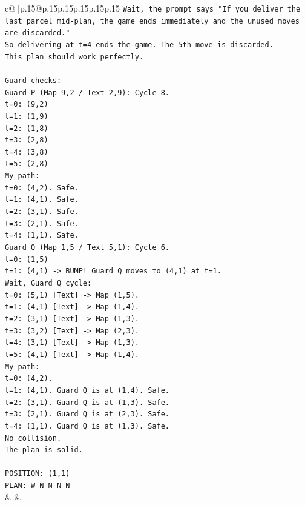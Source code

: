 \documentclass{article}
\begin{document}
{\begin{supertabular}{c@{$\;$}|p{.15\linewidth}@{}p{.15\linewidth}p{.15\linewidth}p{.15\linewidth}p{.15\linewidth}p{.15\linewidth}}
{{{\texttt{Wait, the prompt says "If you deliver the last parcel mid{-}plan, the game ends immediately and the unused moves are discarded."} \\
\texttt{So delivering at t=4 ends the game. The 5th move is discarded.} \\
\texttt{This plan should work perfectly.} \\
\\ 
\texttt{Guard checks:} \\
\texttt{Guard P (Map 9,2 / Text 2,9): Cycle 8.} \\
\texttt{t=0: (9,2)} \\
\texttt{t=1: (1,9)} \\
\texttt{t=2: (1,8)} \\
\texttt{t=3: (2,8)} \\
\texttt{t=4: (3,8)} \\
\texttt{t=5: (2,8)} \\
\texttt{My path:} \\
\texttt{t=0: (4,2). Safe.} \\
\texttt{t=1: (4,1). Safe.} \\
\texttt{t=2: (3,1). Safe.} \\
\texttt{t=3: (2,1). Safe.} \\
\texttt{t=4: (1,1). Safe.} \\
\texttt{Guard Q (Map 1,5 / Text 5,1): Cycle 6.} \\
\texttt{t=0: (1,5)} \\
\texttt{t=1: (4,1) {-}> BUMP! Guard Q moves to (4,1) at t=1.} \\
\texttt{Wait, Guard Q cycle:} \\
\texttt{t=0: (5,1) {[}Text{]} {-}> Map (1,5).} \\
\texttt{t=1: (4,1) {[}Text{]} {-}> Map (1,4).} \\
\texttt{t=2: (3,1) {[}Text{]} {-}> Map (1,3).} \\
\texttt{t=3: (3,2) {[}Text{]} {-}> Map (2,3).} \\
\texttt{t=4: (3,1) {[}Text{]} {-}> Map (1,3).} \\
\texttt{t=5: (4,1) {[}Text{]} {-}> Map (1,4).} \\
\texttt{My path:} \\
\texttt{t=0: (4,2).} \\
\texttt{t=1: (4,1). Guard Q is at (1,4). Safe.} \\
\texttt{t=2: (3,1). Guard Q is at (1,3). Safe.} \\
\texttt{t=3: (2,1). Guard Q is at (2,3). Safe.} \\
\texttt{t=4: (1,1). Guard Q is at (1,3). Safe.} \\
\texttt{No collision.} \\
\texttt{The plan is solid.} \\
\\ 
\texttt{POSITION: (1,1)} \\
\texttt{PLAN: W N N N N} \\
            }
        }
    }
    & & \\ \\


\end{supertabular}}
\end{document}
